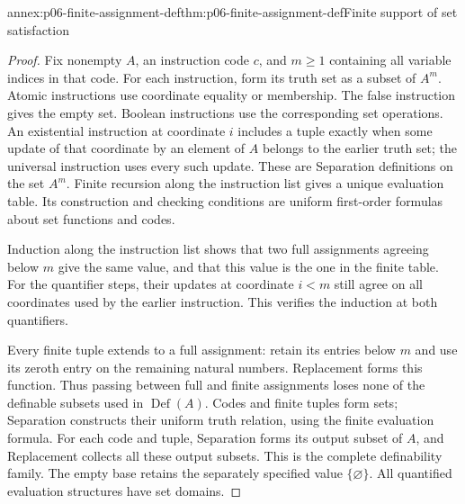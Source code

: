 \begin{annexitem}{annex:p06-finite-assignment-def}{thm:p06-finite-assignment-def}{Finite support of set satisfaction}
\begin{proof}
Fix nonempty \(A\), an instruction code \(c\), and \(m\geq1\)
containing all variable indices in that code.
For each instruction, form its truth set as a subset of \(A^m\).
Atomic instructions use coordinate equality or membership.
The false instruction gives the empty set.
Boolean instructions use the corresponding set operations.
An existential instruction at coordinate \(i\) includes a tuple
exactly when some update of that coordinate by an element of \(A\)
belongs to the earlier truth set; the universal instruction
uses every such update.
These are Separation definitions on the set \(A^m\).
Finite recursion along the instruction list gives a unique
evaluation table. Its construction and checking conditions are
uniform first-order formulas about set functions and codes.

Induction along the instruction list shows that two full
assignments agreeing below \(m\) give the same value, and
that this value is the one in the finite table.
For the quantifier steps, their updates at coordinate \(i<m\)
still agree on all coordinates used by the earlier instruction.
This verifies the induction at both quantifiers.

Every finite tuple extends to a full assignment: retain its
entries below \(m\) and use its zeroth entry on the remaining
natural numbers. Replacement forms this function.
Thus passing between full and finite assignments loses none of
the definable subsets used in \(\operatorname{Def}(A)\).
Codes and finite tuples form sets; Separation constructs their
uniform truth relation, using the finite evaluation formula.
For each code and tuple, Separation forms its output subset of
\(A\), and Replacement collects all these output subsets.
This is the complete definability family.
The empty base retains the separately specified value
\(\{\varnothing\}\).
All quantified evaluation structures have set domains.
\end{proof}
\end{annexitem}

